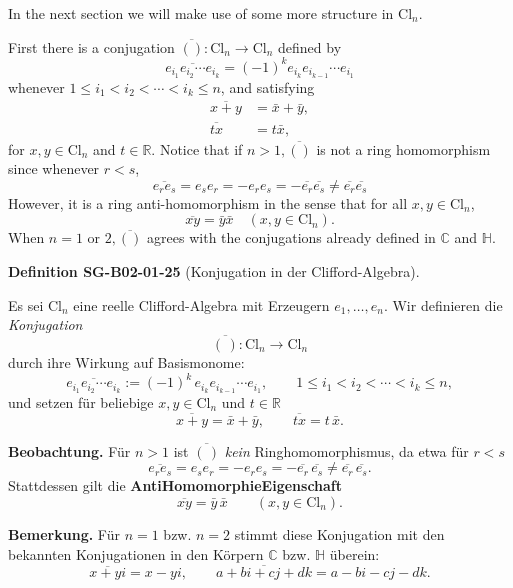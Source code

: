 \documentclass[10pt, letterpaper]{article}
\newcommand{\R}{\mathbb{R}}
\newcommand{\QU}{\mathbb{H}}
\newcommand{\C}{\mathbb{C}}
\newcommand{\Cl}{\mathrm{Cl}}
\newcommand{\CustomHeading}[3]{%
  \par\medskip\noindent%
  \textbf{#1 #2} \textnormal{(#3)}.\enskip%
}
\newenvironment{DEF}[2]{\begin{unitbox}\CustomHeading{Definition}{#1}{#2}}{\end{unitbox}}
\begin{document}
In the next section we will make use of some more structure in $\mathrm{Cl}_{n}$. 


First there is a conjugation $\overline{()}: \mathrm{Cl}_{n} \longrightarrow \mathrm{Cl}_{n}$ defined by
$$
\overline{e_{i_{1}} e_{i_{2}} \cdots e_{i_{k}}}=(-1)^{k} e_{i_{k}} e_{i_{k-1}} \cdots e_{i_{1}}
$$
whenever $1 \leqslant i_{1}<i_{2}<\cdots<i_{k} \leqslant n$, and satisfying
$$
\begin{aligned}
\overline{x+y} & =\bar{x}+\bar{y}, \\
\overline{t x} & =t \bar{x},
\end{aligned}
$$
for $x, y \in \mathrm{Cl}_{n}$ and $t \in \mathbb{R}$. Notice that if $n>1, \overline{()}$ is not a ring homomorphism since whenever $r<s$,
$$
\overline{e_{r} e_{s}}=e_{s} e_{r}=-e_{r} e_{s}=-\overline{e_{r}} \overline{e_{s}} \neq \overline{e_{r}} \overline{e_{s}}
$$
However, it is a ring anti-homomorphism in the sense that for all $x, y \in \mathrm{Cl}_{n}$,
$$
\overline{x y}=\bar{y} \bar{x} \quad\left(x, y \in \mathrm{Cl}_{n}\right) .
$$
When $n=1$ or $2, \overline{()}$ agrees with the conjugations already defined in $\mathbb{C}$ and $\mathbb{H}$.




\begin{DEF}{SG-B02-01-25}{Konjugation in der Clifford-Algebra}
Es sei \( \Cl_n \) eine reelle Clifford-Algebra mit Erzeugern \( e_1,\dots,e_n \).
Wir definieren die \emph{Konjugation}
\[
\overline{(\,)}:\Cl_n \longrightarrow \Cl_n
\]
durch ihre Wirkung auf Basis­monome:
\[
\overline{e_{i_1} e_{i_2} \cdots e_{i_k}}
:= (-1)^k\, e_{i_k} e_{i_{k-1}} \cdots e_{i_1},
\qquad
1 \le i_1 < i_2 < \cdots < i_k \le n,
\]
und setzen für beliebige \(x,y\in\Cl_n\) und \(t\in\R\)
\[
\overline{x+y}=\bar x+\bar y,
\qquad
\overline{t x}=t\,\bar x.
\]

\textbf{Beobachtung.}
Für \(n>1\) ist \(\overline{(\,)}\) \emph{kein} Ringhomomorphismus, da etwa für \(r<s\)
\[
\overline{e_r e_s}
= e_s e_r
= -e_r e_s
= -\overline{e_r}\,\overline{e_s}
\ne \overline{e_r}\,\overline{e_s}.
\]
Stattdessen gilt die \textbf{Anti\-Homomorphie\-Eigenschaft}
\[
\overline{xy} = \bar y\,\bar x
\qquad(x,y\in\Cl_n).
\]

\textbf{Bemerkung.}
Für \(n=1\) bzw. \(n=2\) stimmt diese Konjugation mit den bekannten Konjugationen
in den Körpern \(\C\) bzw. \(\QU\) überein:
\[
\overline{x+yi}=x-yi, \qquad
\overline{a+bi+cj+dk}=a-bi-cj-dk.
\]
\end{DEF}
\end{document}

